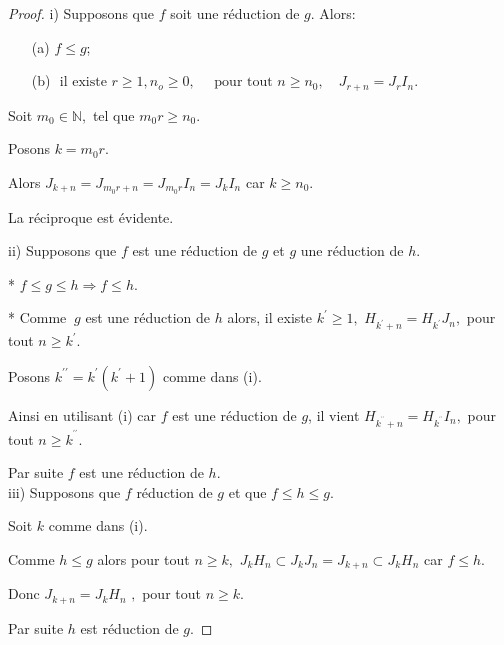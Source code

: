\begin{proof}
	i) Supposons que $f$ soit une réduction de $g$. Alors:
	\begin{enumerate}
		\item[(a)] $f \leqslant g$;
		\item[(b)] $\text{ il existe } r \geqslant 1,n_o \geqslant 0 ,\quad \text{ pour tout } n \geqslant n_0,\quad J_{r+n}= J_r I_n $.
	\end{enumerate}
	Soit $m_{0}\in \mathbb{N},$ tel que $m_{0}r\geq n_{0}$.
	
	Posons $k=m_{0}r$.
	
	Alors $J_{k+n}=J_{m_{0}r+n}=J_{m_{0}r}I_{n}=J_{k}I_{n}$ car $k\geq n_{0}.$
	
	La réciproque est évidente.
	
	ii) Supposons que $f$ est une réduction de $g$ et $g$ une réduction
	de $h.$
	
	* $f\leq g\leq h\Rightarrow f\leq h$.
	
	* Comme $\ g$ est une réduction de $h$ alors, il existe $k^{\prime }\geq
	1,$ $H_{k^{\prime }+n}=H_{k^{\prime }}J_{n},$ pour tout $n\geq k^{\prime }.$
	
	Posons $k^{\prime \prime }=k^{\prime }(k^{\prime }+1)$ comme dans (i).
	
	Ainsi en utilisant (i) car $f$ est une réduction de $g$, il vient  $H_{k^{^{\prime \prime }}+n}=H_{k^{^{\prime \prime }}}I_{n},$ pour tout $n\geq k^{^{\prime \prime }}.$
	
	Par suite $f$ est une réduction de $h$. \\
	
	iii) Supposons que $f$ réduction de $g$ et que $f\leq h\leq g.$
	
	Soit $k$ comme dans (i).
	
	Comme $h\leq g$ alors pour tout $n\geq k,$ $J_{k}H_{n}\subset
	J_{k}J_{n}=J_{k+n}\subset J_{k}H_{n}$ car $f\leq h.$
	
	Donc $J_{k+n}=J_{k}H_{n}$ $,$ pour tout $n\geq k.$
	
	Par suite $h$ est réduction de $g.$
\end{proof}


